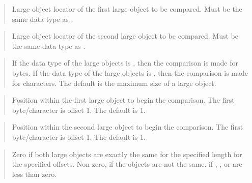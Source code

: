 \documentclass[letterpaper,10pt,english,openany,oneside]{sphinxmanual}
\begin{document}

\begin{quote}

Large object locator of the first large object to be compared. Must be
the same data type as .
\end{quote}

\begin{quote}

Large object locator of the second large object to be compared. Must be
the same data type as .
\end{quote}

\begin{quote}

If the data type of the large objects is , then the comparison is
made for  bytes. If the data type of the large objects is ,
then the comparison is made for  characters. The default is the
maximum size of a large object.
\end{quote}

\begin{quote}

Position within the first large object to begin the comparison. The
first byte/character is offset 1. The default is 1.
\end{quote}

\begin{quote}

Position within the second large object to begin the comparison. The
first byte/character is offset 1. The default is 1.
\end{quote}

\begin{quote}

Zero if both large objects are exactly the same for the specified length
for the specified offsets. Non-zero, if the objects are not the same.
 if , , or  are less than zero.
\end{quote}
\end{document}
